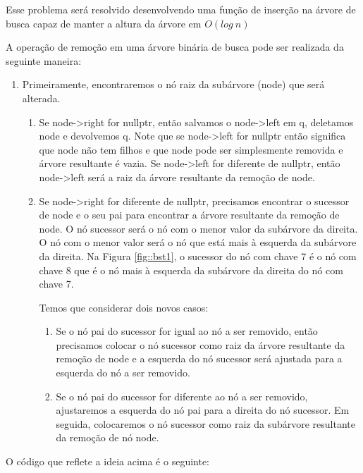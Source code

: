 Esse problema será resolvido desenvolvendo uma função de inserção na árvore de busca capaz de manter a altura da árvore em  $O(log ~n)$

A operação de remoção em uma árvore binária de busca pode ser realizada da seguinte maneira:

\begin{enumerate}
    \item Primeiramente, encontraremos o nó raiz da subárvore (node) que será alterada.
    \begin{enumerate}
    \item Se node->right for nullptr, então salvamos o node->left em q, deletamos node e devolvemos q. Note que se  node->left for nullptr então significa que node não tem filhos e que node pode ser simplesmente removida e árvore resultante é vazia. Se node->left for diferente de nullptr, então node->left será a raiz da árvore resultante da remoção de node.
    \item Se node->right for diferente de nullptr, precisamos encontrar o sucessor de node e o seu pai para encontrar a árvore resultante da remoção de node. O nó sucessor será o nó com o menor valor da subárvore da direita. O nó com o menor valor será o nó que está mais à esquerda da subárvore da direita. Na Figura \ref{fig::bst1}, o sucessor do nó com chave 7 é o nó com chave 8 que é o nó mais à esquerda da subárvore da direita do nó com chave 7.
    
    
    Temos que considerar dois novos casos:
        \begin{enumerate}
        \item Se o nó pai do sucessor for igual ao nó a ser removido, então precisamos colocar o nó sucessor como raiz da árvore resultante da remoção de node e a esquerda do nó sucessor será ajustada para a esquerda do nó a ser removido.
        \item Se o nó pai do sucessor for diferente ao nó a ser removido, ajustaremos a esquerda do nó pai para a direita do nó sucessor. Em seguida, colocaremos o nó sucessor como raiz da subárvore resultante da remoção de nó node.
        
        \end{enumerate}
        
    \end{enumerate}
\end{enumerate}

O código que reflete a ideia acima é o seguinte:

